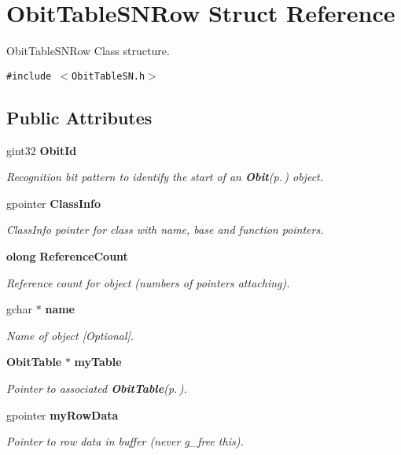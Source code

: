 \section{Obit\-Table\-SNRow Struct Reference}
\label{structObitTableSNRow}
Obit\-Table\-SNRow Class structure.  


{\tt \#include $<$Obit\-Table\-SN.h$>$}

\subsection*{Public Attributes}
\begin{CompactItemize}
\item 
gint32 {\bf Obit\-Id}
\begin{CompactList}\small\item\em Recognition bit pattern to identify the start of an {\bf Obit}{\rm (p.\,\pageref{structObit})} object. \item\end{CompactList}\item 
gpointer {\bf Class\-Info}
\begin{CompactList}\small\item\em Class\-Info pointer for class with name, base and function pointers. \item\end{CompactList}\item 
{\bf olong} {\bf Reference\-Count}
\begin{CompactList}\small\item\em Reference count for object (numbers of pointers attaching). \item\end{CompactList}\item 
gchar $\ast$ {\bf name}
\begin{CompactList}\small\item\em Name of object [Optional]. \item\end{CompactList}\item 
{\bf Obit\-Table} $\ast$ {\bf my\-Table}
\begin{CompactList}\small\item\em Pointer to associated {\bf Obit\-Table}{\rm (p.\,\pageref{structObitTable})}. \item\end{CompactList}\item 
gpointer {\bf my\-Row\-Data}
\begin{CompactList}\small\item\em Pointer to row data in buffer (never g\_\-free this). \item\end{CompactList}\item 

\end{CompactItemize}
